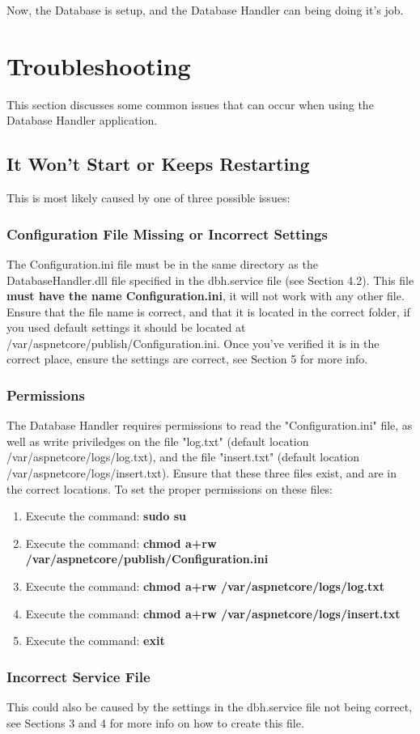 \documentclass[letterpaper]{article}
\begin{document}
	Now, the Database is setup, and the Database Handler can being doing it's job.
	
	\section{Troubleshooting}
	This section discusses some common issues that can occur when using the Database Handler application.
	
	\subsection{It Won't Start or Keeps Restarting}
	This is most likely caused by one of three possible issues:
	
	\subsubsection{Configuration File Missing or Incorrect Settings}
	The Configuration.ini file must be in the same directory as the DatabaseHandler.dll file specified in the dbh.service file (see Section 4.2). This file \textbf{must have the name Configuration.ini}, it will not work with any other file. Ensure that the file name is correct, and that it is located in the correct folder, if you used default settings it should be located at /var/aspnetcore/publish/Configuration.ini. Once you've verified it is in the correct place, ensure the settings are correct, see Section 5 for more info.
	
	\subsubsection{Permissions}
	The Database Handler requires permissions to read the "Configuration.ini" file, as well as write priviledges on the file "log.txt" (default location /var/aspnetcore/logs/log.txt), and the file "insert.txt" (default location /var/aspnetcore/logs/insert.txt). Ensure that these three files exist, and are in the correct locations. To set the proper permissions on these files:
	\begin{enumerate}
		\item Execute the command: \textbf{sudo su}
		\item Execute the command: \textbf{chmod a+rw /var/aspnetcore/publish/Configuration.ini}
		\item Execute the command: \textbf{chmod a+rw /var/aspnetcore/logs/log.txt}
		\item Execute the command: \textbf{chmod a+rw /var/aspnetcore/logs/insert.txt}
		\item Execute the command: \textbf{exit}
	\end{enumerate}
	
	\subsubsection{Incorrect Service File}
	This could also be caused by the settings in the dbh.service file not being correct, see Sections 3 and 4 for more info on how to create this file.
	
\end{document}
